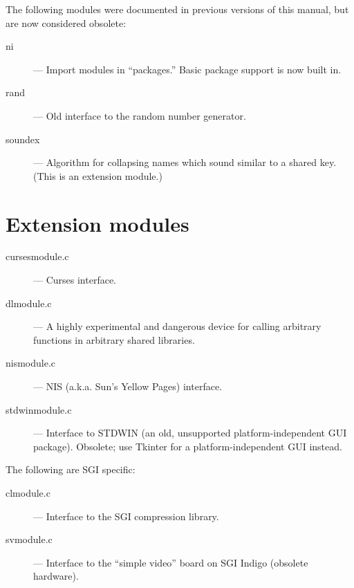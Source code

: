 The following modules were documented in previous versions of this
manual, but are now considered obsolete:

\begin{description}
\item[ni]
--- Import modules in ``packages.''  Basic package support is now
built in.

\item[rand]
--- Old interface to the random number generator.

\item[soundex]
--- Algorithm for collapsing names which sound similar to a shared
key.  (This is an extension module.)
\end{description}


\section{Extension modules}

\begin{description}
\item[cursesmodule.c]
--- Curses interface.

\item[dlmodule.c]
---  A highly experimental and dangerous device for calling
arbitrary \C{} functions in arbitrary shared libraries.

\item[nismodule.c]
--- NIS (a.k.a. Sun's Yellow Pages) interface.

\item[stdwinmodule.c]
--- Interface to STDWIN (an old, unsupported
platform-independent GUI package).  Obsolete; use Tkinter for a
platform-independent GUI instead.
\end{description}

The following are SGI specific:

\begin{description}
\item[clmodule.c]
--- Interface to the SGI compression library.

\item[svmodule.c]
--- Interface to the ``simple video'' board on SGI Indigo
(obsolete hardware).
\end{description}
